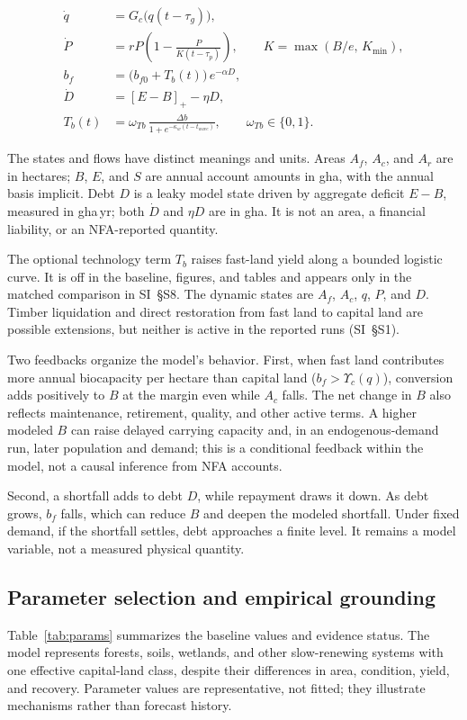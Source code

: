 \documentclass[preprint,12pt,authoryear]{elsarticle}
\newcommand{\pos}[1]{\left[#1\right]_+}
\newcommand{\Ups}{\Upsilon_c}
\begin{document}
\begin{align}
\dot q&=G_c\big(q(t-\tau_g)\big),\label{eq:q}\\
\dot P&=rP\left(1-\frac{P}{K(t-\tau_p)}\right),\qquad K=\max(B/e,\,K_{\min}),\label{eq:P}\\
b_f&=\big(b_{f0}+T_b(t)\big)\,e^{-\alpha D},\label{eq:bf}\\
\dot D&=\pos{E-B}-\eta D,\label{eq:D}\\
T_b(t)&=\omega_{Tb}\,\frac{\Delta b}{1+e^{-\kappa_w(t-t_{wave})}},\qquad \omega_{Tb}\in\{0,1\}.\label{eq:Tb}
\end{align}

The states and flows have distinct meanings and units. Areas $A_f$, $A_c$, and $A_r$ are in hectares; $B$, $E$, and $S$ are annual account amounts in gha, with the annual basis implicit. Debt $D$ is a leaky model state driven by aggregate deficit $E-B$, measured in gha\,yr; both $\dot D$ and $\eta D$ are in gha. It is not an area, a financial liability, or an NFA-reported quantity.

The optional technology term $T_b$ raises fast-land yield along a bounded logistic curve. It is off in the baseline, figures, and tables and appears only in the matched comparison in SI~\S S8. The dynamic states are $A_f$, $A_c$, $q$, $P$, and $D$. Timber liquidation and direct restoration from fast land to capital land are possible extensions, but neither is active in the reported runs (SI~\S S1).

Two feedbacks organize the model's behavior. First, when fast land contributes more annual biocapacity per hectare than capital land ($b_f>\Ups(q)$), conversion adds positively to $B$ at the margin even while $A_c$ falls. The net change in $B$ also reflects maintenance, retirement, quality, and other active terms. A higher modeled $B$ can raise delayed carrying capacity and, in an endogenous-demand run, later population and demand; this is a conditional feedback within the model, not a causal inference from NFA accounts.

Second, a shortfall adds to debt $D$, while repayment draws it down. As debt grows, $b_f$ falls, which can reduce $B$ and deepen the modeled shortfall. Under fixed demand, if the shortfall settles, debt approaches a finite level. It remains a model variable, not a measured physical quantity.

\begin{samepage}
\subsection{Parameter selection and empirical grounding}\label{sec:params}

Table~\ref{tab:params} summarizes the baseline values and evidence status. The model represents forests, soils, wetlands, and other slow-renewing systems with one effective capital-land class, despite their differences in area, condition, yield, and recovery. Parameter values are representative, not fitted; they illustrate mechanisms rather than forecast history.\par
\end{samepage}
\end{document}
